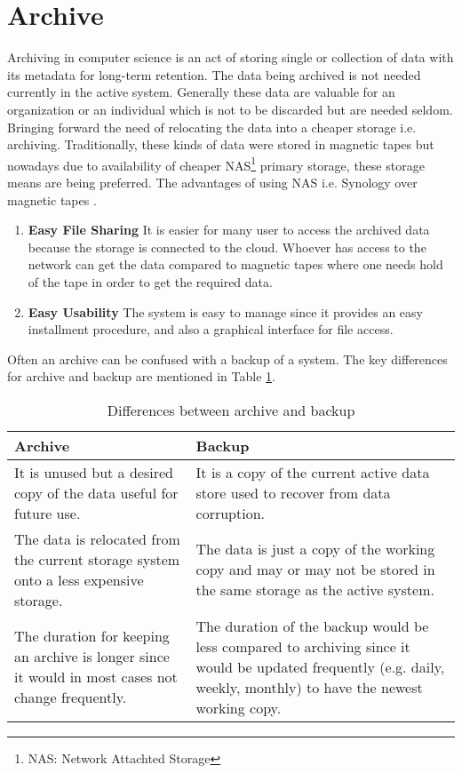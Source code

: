 \section{Archive}
Archiving in computer science is an act of storing single or collection of data with its metadata for long-term retention. The data being archived is 
not needed currently in the active system. Generally these data are valuable for an organization or an individual which is not to be discarded but are needed seldom. 
Bringing forward the need of relocating the data into a cheaper storage i.e. archiving. Traditionally, these kinds of data were stored in magnetic tapes but nowadays 
due to availability of cheaper NAS\footnote{NAS: Network Attachted Storage} primary storage, 
these storage means are being preferred. 
The advantages of using NAS i.e. Synology over magnetic tapes \cite{Synology}.
\begin{enumerate}
    \item \textbf{Easy File Sharing} It is easier for many user to access the archived data because the storage is connected to the cloud. Whoever has access to the
    network can get the data compared to magnetic tapes where one needs hold of the tape in order to get the required data.
    \item \textbf{Easy Usability} The system is easy to manage since it provides an easy installment procedure, and also a graphical interface for file access.
\end{enumerate}
Often an archive can be confused
with a backup of a system. The key differences for archive and backup are mentioned in Table \ref{table:archiveVsBackup}.

\begin{table}[H]
    \centering
    \begin{tabular}{|p{7cm}|p{7cm}|}
        \hline
            \textbf{Archive}  & \textbf{Backup}\\
        \hline
            It is unused but a desired copy of the data useful for future use.& 
            It is a copy of the current active data store used to recover from data corruption. \\
        \hline
            The data is relocated from the current storage system onto a less expensive storage.
            & The data is just a copy of the working copy and may or may not be stored in the same storage as the active system.\\
        \hline
             The duration for keeping an archive is longer since it would in most cases not change frequently.
             & The duration of the backup would be less compared to archiving since it would be updated frequently (e.g. daily, weekly, monthly) to have the newest 
             working copy.\\
        \hline
    \end{tabular}
    \caption{Differences between archive and backup}
    \label{table:archiveVsBackup}     
\end{table}    